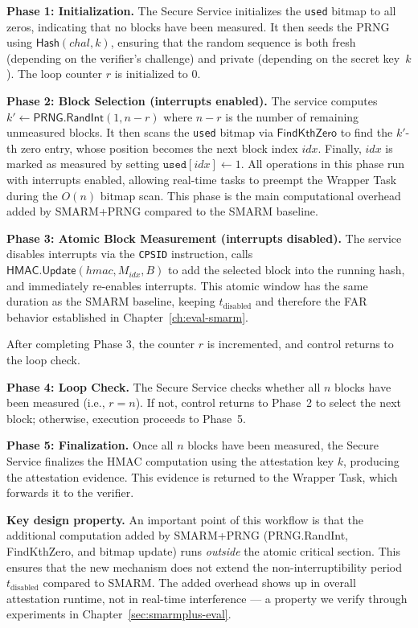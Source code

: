 \documentclass[a4paper,10pt]{article}
\begin{document}
{\textbf{Phase 1: Initialization.}
The Secure Service initializes the \texttt{used} bitmap to all 
zeros, indicating that no blocks have been measured. It then 
seeds the PRNG using $\mathsf{Hash}(\mathit{chal}, k)$, ensuring 
that the random sequence is both fresh (depending on the 
verifier's challenge) and private (depending on the secret 
key~$k$). The loop counter $r$ is initialized to $0$.

\textbf{Phase 2: Block Selection (interrupts enabled).}
The service computes $k' \gets \mathsf{PRNG.RandInt}(1, n-r)$ 
where $n - r$ is the number of remaining unmeasured blocks. 
It then scans the \texttt{used} bitmap via 
$\mathsf{FindKthZero}$ to find the $k'$-th zero entry, 
whose position becomes the next block index 
$\mathit{idx}$. Finally, $\mathit{idx}$ is marked as 
measured by setting $\texttt{used}[\mathit{idx}] \gets 1$. 
All operations in this phase run with interrupts 
enabled, allowing real-time tasks to preempt the Wrapper 
Task during the $O(n)$ bitmap scan. This phase is 
the main computational overhead added by 
SMARM+PRNG compared to the SMARM baseline.

\textbf{Phase 3: Atomic Block Measurement (interrupts disabled).}
The service disables interrupts via the 
\texttt{CPSID} instruction, calls 
$\mathsf{HMAC.Update}(\mathit{hmac}, M_{\mathit{idx}}, B)$ 
to add the selected block into the running hash, 
and immediately re-enables interrupts. This atomic window 
has the same duration as the SMARM baseline, 
keeping $t_{\mathrm{disabled}}$ and therefore the FAR 
behavior established in Chapter~\ref{ch:eval-smarm}.

After completing Phase 3, the counter $r$ is incremented, 
and control returns to the loop check.

\textbf{Phase 4: Loop Check.}
The Secure Service checks whether all $n$ blocks have been 
measured (i.e., $r = n$). If not, control returns to Phase~2 
to select the next block; otherwise, execution proceeds to 
Phase~5.

\textbf{Phase 5: Finalization.}
Once all $n$ blocks have been measured, the Secure Service 
finalizes the HMAC computation using the attestation key $k$, 
producing the attestation evidence. This evidence is returned 
to the Wrapper Task, which forwards it to the verifier.

\textbf{Key design property.}
An important point of this workflow is that the additional 
computation added by SMARM+PRNG 
(\textsf{PRNG.RandInt}, \textsf{FindKthZero}, and bitmap update) 
runs \emph{outside} the atomic critical section. This 
ensures that the new mechanism does not extend the 
non-interruptibility period~$t_{\mathrm{disabled}}$ compared to 
SMARM. The added overhead shows up in overall attestation 
runtime, not in real-time interference — a property we verify 
through experiments in Chapter~\ref{sec:smarmplus-eval}.

}
\end{document}
